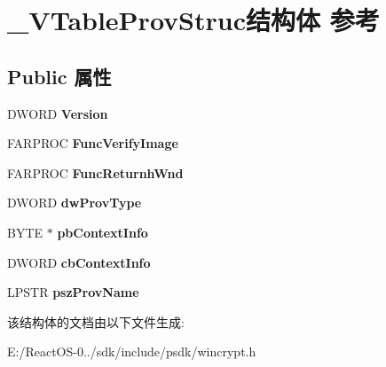 \hypertarget{struct___v_table_prov_struc}{}\section{\+\_\+\+V\+Table\+Prov\+Struc结构体 参考}
\label{struct___v_table_prov_struc}
\subsection*{Public 属性}
\begin{DoxyCompactItemize}
\item 
\mbox{\label{struct___v_table_prov_struc_a20056bf3cea249fafaef8d7dab837290}} 
D\+W\+O\+RD {\bfseries Version}
\item 
\mbox{\label{struct___v_table_prov_struc_a85b8b44243c2a13d9eca75c16ccccdaf}} 
F\+A\+R\+P\+R\+OC {\bfseries Func\+Verify\+Image}
\item 
\mbox{\label{struct___v_table_prov_struc_a92112dffedafe41020a10c15f580967c}} 
F\+A\+R\+P\+R\+OC {\bfseries Func\+Returnh\+Wnd}
\item 
\mbox{\label{struct___v_table_prov_struc_ac6163c144b7ab0176a39d31658c5aa55}} 
D\+W\+O\+RD {\bfseries dw\+Prov\+Type}
\item 
\mbox{\label{struct___v_table_prov_struc_a3bc7d3278e7f412d32b1a89e8fcfa3cb}} 
B\+Y\+TE $\ast$ {\bfseries pb\+Context\+Info}
\item 
\mbox{\label{struct___v_table_prov_struc_adb78cf24ab143732844df797554319a5}} 
D\+W\+O\+RD {\bfseries cb\+Context\+Info}
\item 
\mbox{\label{struct___v_table_prov_struc_abd55589f0c28db258770a5de0aa2753e}} 
L\+P\+S\+TR {\bfseries psz\+Prov\+Name}
\end{DoxyCompactItemize}


该结构体的文档由以下文件生成\+:\begin{DoxyCompactItemize}
\item 
E\+:/\+React\+O\+S-\/0../sdk/include/psdk/wincrypt.\+h\end{DoxyCompactItemize}
